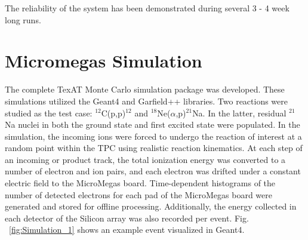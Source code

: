 \documentclass[final,number,sort&compress,5p,times,twocolumn]{elsarticle}
\begin{document}
The reliability of the system has been demonstrated during several 3 - 4 week long runs.
	
\section{Micromegas Simulation}

The complete TexAT Monte Carlo simulation package was developed. These simulations utilized the Geant4 \cite{Geant4} and Garfield++\cite{GARFIELD} libraries. Two reactions were studied as the test case: $^{12}$C(p,p)$^{12}$ and $^{18}$Ne($\alpha$,p)$^{21}$Na. In the latter, residual $^{21}$Na nuclei in both the ground state and first excited state were populated. In the simulation, the incoming ions were forced to undergo the reaction of interest at a random point within the TPC using realistic reaction kinematics. At each step of an incoming or product track, the total ionization energy was converted to a number of electron and ion pairs, and each electron was drifted under a constant electric field to the MicroMegas board. Time-dependent histograms of the number of detected electrons for each pad of the MicroMegas board were generated and stored for offline processing. Additionally, the energy collected in each detector of the Silicon array was also recorded per event. Fig. ~\ref{fig:Simulation_1} shows an example event visualized in Geant4.
	
\end{document}
